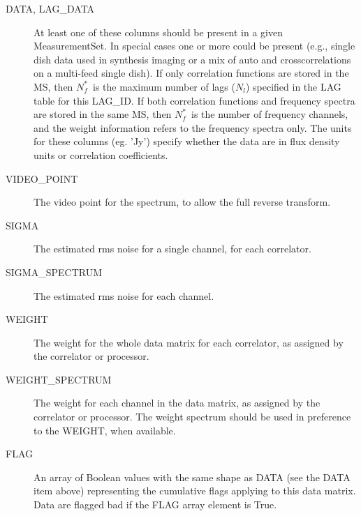 \documentclass{article}
\newcommand{\nfs}{$N_f^*$}
\newcommand{\nl}{$N_l$}
\begin{document}
\begin{description}
\item[DATA, LAG\_DATA] At least one of these columns
should be present in a given MeasurementSet. In special cases one or
more could be present (e.g., single dish data used in synthesis
imaging or a mix of auto and crosscorrelations on a multi-feed single
dish). If only correlation functions are stored in the MS, then \nfs\
is the maximum number of lags (\nl) specified in the LAG table for
this LAG\_ID.  If both correlation functions and frequency spectra are
stored in the same MS, then \nfs\ is the number of frequency channels,
and the weight information refers to the frequency spectra only. The
units for these columns (eg. 'Jy') specify whether the data are in
flux density units or correlation coefficients.

\item[VIDEO\_POINT] The video point for the spectrum, to allow the
full reverse transform.

\item[SIGMA] The estimated rms noise for a single channel, for
each correlator.

\item[SIGMA\_SPECTRUM] The estimated rms noise for each channel.

\item[WEIGHT] The weight for the whole data matrix for each
correlator, as assigned by the correlator or processor.

\item[WEIGHT\_SPECTRUM] The weight for each channel in the data
matrix, as assigned by the correlator or processor. The weight
spectrum should be used in preference to the WEIGHT, when available.

\item[FLAG] An array of Boolean values with the same shape as DATA
(see the DATA item above) representing the cumulative flags applying
to this data matrix. Data are flagged bad if the FLAG array element is True.

\end{description}
\end{document}

